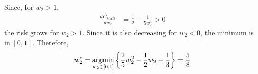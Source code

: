 \begin{solution}
\begin{parts}
Since, for $w_2 >1$,
\begin{align*}
\frac{d\overline{C}_\text{MAD}}{dw_2} 
	&= \frac12 - \frac{1}{5w_2^4} > 0	
\end{align*}
the risk grows for $w_2 > 1$. Since it is also decreasing for $w_2<0$, the minimum is in $[0,1]$. Therefore,
\begin{align*}
w_2^* = \operatorname*{argmin}_{w_2\in[0,1]} \left\{\frac25 w_2^2 - \frac12 w_2 + \frac13 \right\} = \frac{5}{8}
\end{align*}


\end{parts}
\end{solution}
